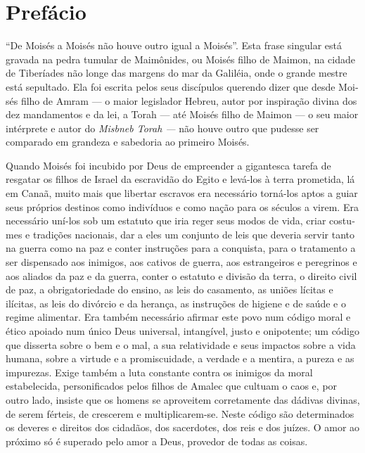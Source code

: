 

\chapter{Prefácio}

``De Moisés a Moisés não houve outro igual a Moisés''. Esta frase
singu­lar está gravada na pedra tumular de Maimônides, ou Moisés filho
de Maimon, na cidade de Tiberíades não longe das margens do mar da
Galiléia, onde o grande mestre está sepultado. Ela foi escrita pelos
seus discípulos querendo dizer que desde Moi­sés filho de Amram --- o
maior legislador Hebreu, autor por inspiração divina dos dez mandamentos
e da lei, a Torah --- até Moisés filho de Maimon --- o seu maior
intérprete e autor do \emph{Misbneb Torah ---} não houve outro que
pudesse ser compara­do em grandeza e sabedoria ao primeiro Moisés.

Quando Moisés foi incubido por Deus de empreender a gigantesca tare­fa
de resgatar os filhos de Israel da escravidão do Egito e levá-los à
terra prometida, lá em Canaã, muito mais que libertar escravos era
necessário torná-los aptos a guiar seus próprios destinos como
indivíduos e como nação para os séculos a virem. Era necessário uní-los
sob um estatuto que iria reger seus modos de vida, criar costu­mes e
tradições nacionais, dar a eles um conjunto de leis que deveria servir
tanto na guerra como na paz e conter instruções para a conquista, para o
tratamento a ser dispensado aos inimigos, aos cativos de guerra, aos
estrangeiros e peregrinos e aos aliados da paz e da guerra, conter o
estatuto e divisão da terra, o direito civil de paz, a obrigatoriedade
do ensino, as leis do casamento, as uniões lícitas e ilícitas, as leis
do divórcio e da herança, as instruções de higiene e de saúde e o regime
alimentar. Era também necessário afirmar este povo num código moral e
ético apoia­do num único Deus universal, intangível, justo e onipotente;
um código que dis­serta sobre o bem e o mal, a sua relatividade e seus
impactos sobre a vida humana, sobre a virtude e a promiscuidade, a
verdade e a mentira, a pureza e as impurezas. Exige também a luta
constante contra os inimigos da moral estabelecida, personifi­cados
pelos filhos de Amalec que cultuam o caos e, por outro lado, insiste que
os homens se aproveitem corretamente das dádivas divinas, de serem
férteis, de cres­cerem e multiplicarem-se. Neste código são determinados
os deveres e direitos dos cidadãos, dos sacerdotes, dos reis e dos
juízes. O amor ao próximo só é superado pelo amor a Deus, provedor de
todas as coisas.


